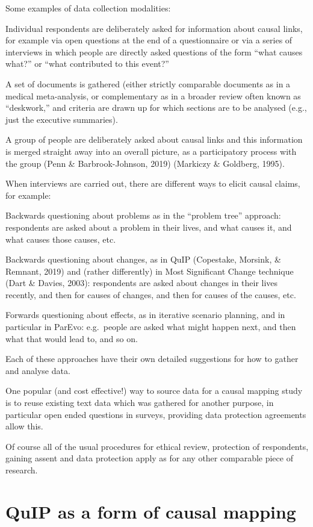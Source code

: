 \documentclass[
]{book}
\begin{document}
Some examples of data collection modalities:

Individual respondents are deliberately asked for information about causal links, for example via open questions at the end of a questionnaire or via a series of interviews in which people are directly asked questions of the form ``what causes what?'' or ``what contributed to this event?''

A set of documents is gathered (either strictly comparable documents as in a medical meta-analysis, or complementary as in a broader review often known as ``deskwork,'' and criteria are drawn up for which sections are to be analysed (e.g., just the executive summaries).

A group of people are deliberately asked about causal links and this information is merged straight away into an overall picture, as a participatory process with the group (Penn \& Barbrook-Johnson, 2019) (Markiczy \& Goldberg, 1995).

When interviews are carried out, there are different ways to elicit causal claims, for example:

Backwards questioning about problems as in the ``problem tree'' approach: respondents are asked about a problem in their lives, and what causes it, and what causes those causes, etc.

Backwards questioning about changes, as in QuIP (Copestake, Morsink, \& Remnant, 2019) and (rather differently) in Most Significant Change technique (Dart \& Davies, 2003): respondents are asked about changes in their lives recently, and then for causes of changes, and then for causes of the causes, etc.

Forwards questioning about effects, as in iterative scenario planning, and in particular in ParEvo: e.g.~people are asked what might happen next, and then what that would lead to, and so on.

Each of these approaches have their own detailed suggestions for how to gather and analyse data.

One popular (and cost effective!) way to source data for a causal mapping study is to reuse existing text data which was gathered for another purpose, in particular open ended questions in surveys, providing data protection agreements allow this.

Of course all of the usual procedures for ethical review, protection of respondents, gaining assent and data protection apply as for any other comparable piece of research.

\hypertarget{quip-as-a-form-of-causal-mapping}{%
\section{QuIP as a form of causal mapping}\label{quip-as-a-form-of-causal-mapping}}
\end{document}

